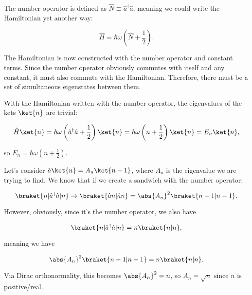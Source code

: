 \begin{parts}
\item The number operator is defined as $\hat{N} \equiv \hat{a}^{\dagger}\hat{a}$, meaning we could write the Hamiltonian yet another way:

  \begin{equation}
    \hat{H} = \hbar\omega\left(\hat{N} + \frac{1}{2}\right).
  \end{equation}

  The Hamiltonian is now constructed with the number operator and constant terms. Since the number operator obviously commutes with itself and any constant, it must also commute with the Hamiltonian. Therefore, there must be a set of simultaneous eigenstates between them.

\item With the Hamiltonian written with the number operator, the eigenvalues of the kets $\ket{n}$ are trivial:

  \begin{equation}
    \hat{H}\ket{n} = \hbar\omega\left(\hat{a}^{\dagger}\hat{a} + \frac{1}{2}\right)\ket{n} = \hbar\omega\left(n + \frac{1}{2}\right)\ket{n} = E_n\ket{n},
  \end{equation}

  so $E_n = \hbar\omega(n + \frac{1}{2})$.


\item Let's consider $\hat{a}\ket{n} = A_n\ket{n-1}$, where $A_n$ is the eigenvalue we are trying to find. We know that if we create a sandwich with the number operator:

  \begin{equation}
    \braket{n | \hat{a}^\dagger \hat{a} | n} \rightarrow \braket{\hat{a}n | \hat{a}n} = \abs{A_n}^2\braket{n-1 | n-1}.
  \end{equation}

  However, obviously, since it's the number operator, we also have

  \begin{equation}
    \braket{n | \hat{a}^\dagger \hat{a} | n} = n\braket{n | n},
  \end{equation}

  meaning we have

  \begin{equation}
    \abs{A_n}^2\braket{n-1 | n-1} = n\braket{n | n}.
  \end{equation}

  Via Dirac orthonormality, this becomes $\abs{A_n}^2 = n$, so $A_n = \sqrt{n}$ since $n$ is positive/real.


\end{parts}
